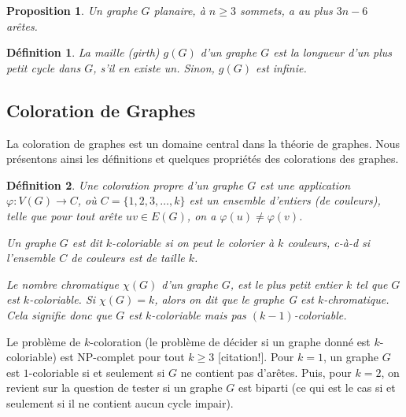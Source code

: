 \documentclass[10pt,a4paper]{article}
\newtheorem{definition}{Définition}
\newtheorem{proposition}{Proposition}
\newtheorem{exemple}{Exemple}
\begin{document}
\begin{proposition}
Un graphe $G$ planaire, à $n \geq 3$ sommets, a au plus $3n - 6$ arêtes.
\end{proposition}

\begin{definition}
La \emph{maille (girth)} $g(G)$ d'un graphe $G$ est la longueur d'un plus petit cycle dans $G$, s'il en existe un. Sinon, $g(G)$ est infinie. %
\end{definition}

\subsection{Coloration de Graphes}
La coloration de graphes est un domaine central dans la théorie de graphes. 
Nous présentons ainsi les définitions et quelques propriétés des colorations des graphes.


\begin{definition}%
Une \emph{coloration propre} d'un graphe $G$ est une application $\varphi: V(G) \to C$, où $C=\{1,2,3,\dots,k\}$ est un ensemble d'entiers (de \emph{couleurs}), telle que pour tout arête $uv \in E(G)$, on a $\varphi(u) \neq \varphi(v)$. 

Un graphe $G$ est dit \emph{$k$-coloriable} si on peut le colorier à $k$ couleurs, c-à-d si l'ensemble $C$ de couleurs est de taille $k$. 

Le \emph{nombre chromatique} $\chi(G)$ d'un graphe $G$, est le plus petit entier $k$ tel que $G$ est $k$-coloriable. Si $\chi(G) = k$, alors on dit que le graphe G est \emph{$k$-chromatique}. Cela signifie donc que $G$ est $k$-coloriable mais  pas $(k-1)$-coloriable.
\end{definition}



Le problème de $k$-coloration (le problème de décider si un graphe donné est $k$-coloriable) est NP-complet pour tout $k \geq 3$ {\color{blue}[citation!]}. Pour $k = 1$, un graphe $G$ est $1$-coloriable si et seulement si $G$ ne contient pas d'arêtes. Puis, pour $k =  2$, on revient sur la question de tester si un graphe $G$ est biparti (ce qui est le cas si et seulement si il ne contient aucun cycle impair). 
\end{document}
